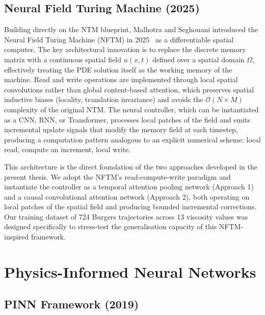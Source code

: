 \subsection{Neural Field Turing Machine (2025)}
\label{sec:bg:nftm}

Building directly on the NTM blueprint, Malhotra and Seghouani introduced the Neural Field Turing Machine (NFTM) in 2025~\cite{malhotra2025neuralfieldturingmachine} as a differentiable spatial computer. The key architectural innovation is to replace the discrete memory matrix with a continuous spatial field $u(x,t)$ defined over a spatial domain $\Omega$, effectively treating the PDE solution itself as the working memory of the machine. Read and write operations are implemented through local spatial convolutions rather than global content-based attention, which preserves spatial inductive biases (locality, translation invariance) and avoids the $\mathcal{O}(N \times M)$ complexity of the original NTM. The neural controller, which can be instantiated as a CNN, RNN, or Transformer, processes local patches of the field and emits incremental update signals that modify the memory field at each timestep, producing a computation pattern analogous to an explicit numerical scheme: local read, compute an increment, local write.

This architecture is the direct foundation of the two approaches developed in the present thesis. We adopt the NFTM's read-compute-write paradigm and instantiate the controller as a temporal attention pooling network (Approach 1) and a causal convolutional attention network (Approach 2), both operating on local patches of the spatial field and producing bounded incremental corrections. Our training dataset of 724 Burgers trajectories across 13 viscosity values was designed specifically to stress-test the generalisation capacity of this NFTM-inspired framework.

\section{Physics-Informed Neural Networks}
\label{sec:bg:pinns}

\subsection{PINN Framework (2019)}
\label{sec:bg:pinn-framework}

